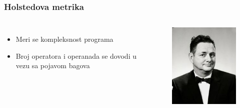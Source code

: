 \documentclass{beamer}
\begin{document}
\begin{frame}
\frametitle{Holstedova metrika}

\begin{columns}[c]

\begin{itemize}
\item Meri se kompleksnost programa
\item Broj operatora i operanada se dovodi u vezu sa pojavom bagova
\end{itemize}

\begin{figure}
\includegraphics[width=1\linewidth]{halstead.png}
\end{figure}

\end{columns}

\end{frame}
\end{document}

